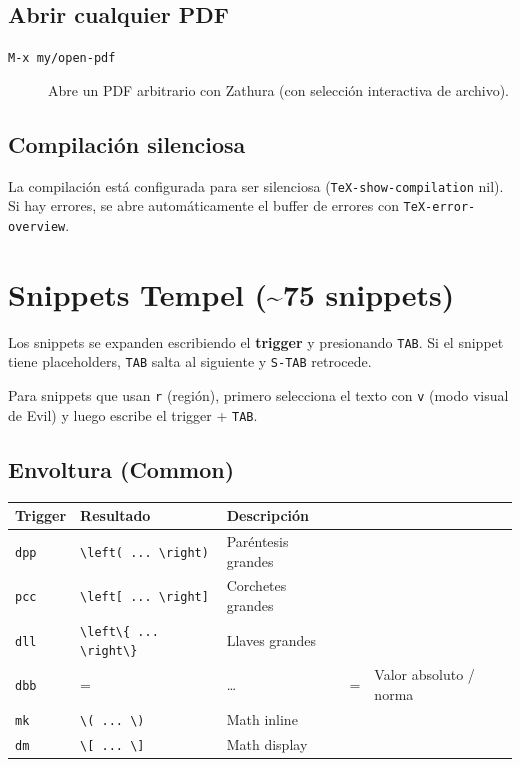 \documentclass[11pt]{article}
\begin{document}
\subsection{Abrir cualquier PDF}
\label{sec:org5a26692}
\begin{description}
\item[{\texttt{M-x my/open-pdf}}] Abre un PDF arbitrario con Zathura (con selección interactiva de archivo).
\end{description}
\subsection{Compilación silenciosa}
\label{sec:orga8af0df}
La compilación está configurada para ser silenciosa (\texttt{TeX-show-compilation} nil). Si hay errores, se abre automáticamente el buffer de errores con \texttt{TeX-error-overview}.
\section{Snippets Tempel (\textasciitilde{}75 snippets)}
\label{sec:org3384402}

Los snippets se expanden escribiendo el \textbf{trigger} y presionando \texttt{TAB}. Si el snippet tiene placeholders, \texttt{TAB} salta al siguiente y \texttt{S-TAB} retrocede.

Para snippets que usan \texttt{r} (región), primero selecciona el texto con \texttt{v} (modo visual de Evil) y luego escribe el trigger + \texttt{TAB}.
\subsection{Envoltura (Common)}
\label{sec:org89e8fbb}
\begin{center}
\begin{tabular}{lll}
Trigger & Resultado & Descripción\\
\hline
\texttt{dpp} & \texttt{\textbackslash{}left( ... \textbackslash{}right)} & Paréntesis grandes\\
\texttt{pcc} & \texttt{\textbackslash{}left[ ... \textbackslash{}right]} & Corchetes grandes\\
\texttt{dll} & \texttt{\textbackslash{}left\textbackslash{}\{ ... \textbackslash{}right\textbackslash{}\}} & Llaves grandes\\
\texttt{dbb} & =\left & \ldots{} \right & = & Valor absoluto / norma\\
\texttt{mk} & \texttt{\textbackslash{}( ... \textbackslash{})} & Math inline\\
\texttt{dm} & \texttt{\textbackslash{}[ ... \textbackslash{}]} & Math display\\
\end{tabular}
\end{center}
\end{document}
